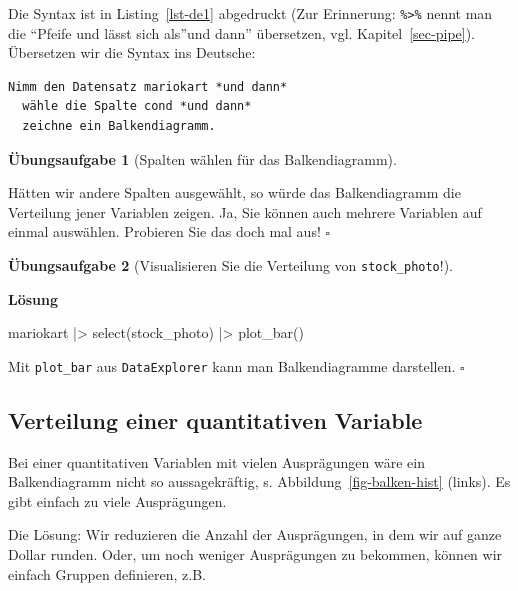 \documentclass[
  letterpaper,
  oneside,
  open=any]{scrbook}
\newenvironment{Shaded}{\begin{snugshade}}{\end{snugshade}}
\newcommand{\FunctionTok}[1]{\textcolor[rgb]{0.28,0.35,0.67}{#1}}
\newcommand{\NormalTok}[1]{\textcolor[rgb]{0.00,0.23,0.31}{#1}}
\newcommand{\SpecialCharTok}[1]{\textcolor[rgb]{0.37,0.37,0.37}{#1}}
\theoremstyle{definition}
\newtheorem{exercise}{Übungsaufgabe}[chapter]
\theoremstyle{definition}
\theoremstyle{definition}
\theoremstyle{remark}
\begin{document}
Die Syntax ist in Listing~\ref{lst-de1} abgedruckt (Zur Erinnerung:
\texttt{\%\textgreater{}\%} nennt man die \enquote{Pfeife und lässt sich
als}und dann'' übersetzen, vgl. Kapitel~\ref{sec-pipe}). Übersetzen wir
die Syntax ins Deutsche:

\begin{verbatim}
Nimm den Datensatz mariokart *und dann*
  wähle die Spalte cond *und dann*
  zeichne ein Balkendiagramm.
\end{verbatim}

\begin{exercise}[Spalten wählen für das
Balkendiagramm]\protect\hypertarget{exr-de1}{}\label{exr-de1}

Hätten wir andere Spalten ausgewählt, so würde das Balkendiagramm die
Verteilung jener Variablen zeigen. Ja, Sie können auch mehrere Variablen
auf einmal auswählen. Probieren Sie das doch mal aus! \(\square\)

\end{exercise}

\begin{exercise}[Visualisieren Sie die Verteilung von
\texttt{stock\_photo}!]\protect\hypertarget{exr-balken}{}\label{exr-balken}

\textbf{Lösung}

\begin{Shaded}
\begin{Highlighting}[]
\NormalTok{mariokart }\SpecialCharTok{|\textgreater{}} 
  \FunctionTok{select}\NormalTok{(stock\_photo) }\SpecialCharTok{|\textgreater{}} 
  \FunctionTok{plot\_bar}\NormalTok{()}
\end{Highlighting}
\end{Shaded}

Mit \texttt{plot\_bar} aus \texttt{DataExplorer} kann man
Balkendiagramme darstellen. \(\square\)

\end{exercise}

\subsection{Verteilung einer quantitativen
Variable}\label{verteilung-einer-quantitativen-variable}

Bei einer quantitativen Variablen mit vielen Ausprägungen wäre ein
Balkendiagramm nicht so aussagekräftig, s.
Abbildung~\ref{fig-balken-hist} (links). Es gibt einfach zu viele
Ausprägungen.

Die Lösung: Wir reduzieren die Anzahl der Ausprägungen, in dem wir auf
ganze Dollar runden. Oder, um noch weniger Ausprägungen zu bekommen,
können wir einfach Gruppen definieren, z.B.
\end{document}
